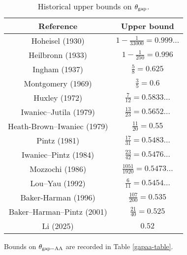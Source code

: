 \begin{table}[ht]
    \caption{Historical upper bounds on $\theta_{\mathrm{gap}}$.}
    \centering
    \renewcommand{\arraystretch}{1.2}
    \begin{tabular}{|c|c|}
    \hline
    Reference & Upper bound \\
    \hline
    Hoheisel (1930) \cite{hoheisel_1930} & $1 - \frac{1}{33000} = 0.999\dots$ \\
    \hline
    Heilbronn (1933) \cite{heilbronn_1933} & $1 - \frac{1}{250} = 0.996$ \\
    \hline
    Ingham (1937) \cite{ingham_difference_1937} & $\frac{5}{8} = 0.625$ \\
    \hline
    Montgomery (1969) \cite{montgomery_1969} & $\frac{3}{5} = 0.6$ \\
    \hline
    Huxley (1972) \cite{Huxley} & $\frac{7}{12} = 0.5833\dots$ \\
    \hline
    Iwaniec--Jutila (1979)\cite{iwaniec-jutila} & $\frac{13}{23} = 0.5652\dots$ \\
    \hline
    Heath-Brown--Iwaniec (1979) \cite{heathbrown_iwaniec_1979} & $\frac{11}{20} = 0.55$ \\
    \hline
    Pintz (1981) \cite{pintz_1981} & $\frac{17}{31} = 0.5483\dots$ \\
    \hline
    Iwaniec--Pintz (1984) \cite{iwaniec-pintz} & $\frac{23}{42} = 0.5476\dots$\\
    \hline
    Mozzochi (1986) \cite{mozzochi-consecutive} & $\frac{1051}{1920} = 0.5473\dots$ \\
    \hline
    Lou--Yau (1992) \cite{lou-yao-chebychev} & $\frac{6}{11} = 0.5454\dots$\\
    \hline
    Baker-Harman (1996) \cite{baker-harman} & $\frac{107}{200} = 0.535$\\
    \hline
    Baker--Harman--Pintz (2001) \cite{baker-harman-pintz} & $\frac{21}{40} = 0.525$ \\
    \hline
    Li (2025) \cite{li_number_2025} & $0.52$\\
    \hline
    \end{tabular}
    \end{table}\label{gapmax-table}

Bounds on $\theta_{\mathrm{gap-AA}}$ are recorded in Table \ref{gapaa-table}.

